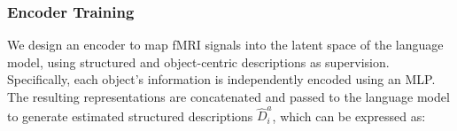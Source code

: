 




\subsubsection{Encoder Training}
\label{sec:encoder_training}
We design an encoder to map fMRI signals into the latent space of the language model, using structured and object-centric descriptions as supervision. Specifically, each object's information is independently encoded using an MLP. The resulting representations are concatenated and passed to the language model to generate estimated structured descriptions  $\hat{D}_i^a$, which can be expressed as:


